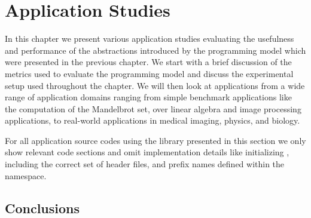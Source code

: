 \chapter{Application Studies}
\label{chapter:skelcl-evaluation}

In this chapter we present various application studies evaluating the usefulness and performance of the abstractions introduced by the \SkelCL programming model which were presented in the previous chapter.
We start with a brief discussion of the metrics used to evaluate the \SkelCL programming model and discuss the experimental setup used throughout the chapter.
We will then look at applications from a wide range of application domains ranging from simple benchmark applications like the computation of the Mandelbrot set, over linear algebra and image processing applications, to real-world applications in medical imaging, physics, and biology.

For all application source codes using the \SkelCL library presented in this section we only show relevant code sections and omit implementation details like initializing \SkelCL, including the correct set of header files, and prefix names defined within the  namespace.















\section{Conclusions}

